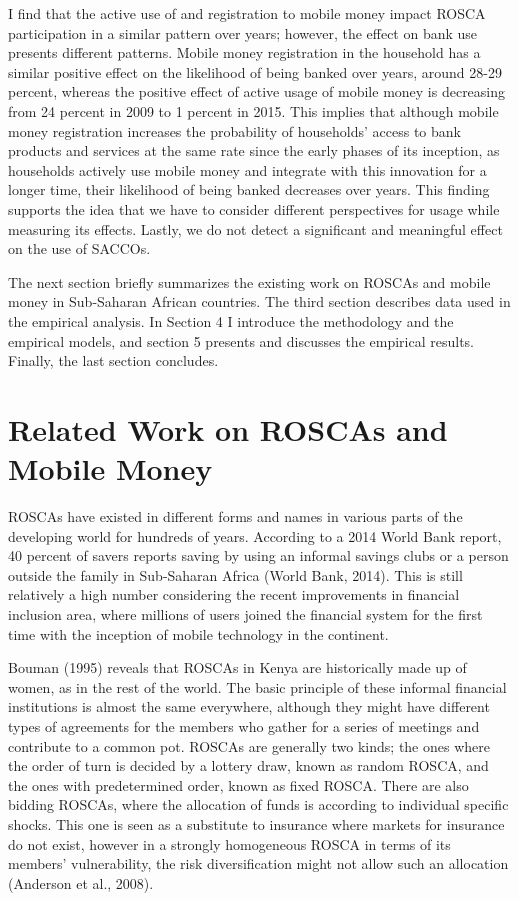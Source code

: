 \documentclass[11pt]{article}
\numberwithin{equation}{section}
\begin{document}
I find that the active use of and registration to mobile money impact ROSCA participation in a similar pattern over years; however, the effect on bank use presents different patterns. Mobile money registration in the household has a similar positive effect on the likelihood of being banked over years, around 28-29 percent, whereas the positive effect of active usage of mobile money is decreasing from 24 percent in 2009 to 1 percent in 2015. This implies that although mobile money registration increases the probability of households' access to bank products and services at the same rate since the early phases of its inception, as households actively use mobile money and integrate with this innovation for a longer time, their likelihood of being banked decreases over years. This finding supports the idea that we have to consider different perspectives for usage while measuring its effects. Lastly, we do not detect a significant and meaningful effect on the use of SACCOs.

The next section briefly summarizes the existing work on ROSCAs and mobile money in Sub-Saharan African countries. The third section describes data used in the empirical analysis. In Section 4 I introduce the methodology and the empirical models, and section 5 presents and discusses the empirical results. Finally, the last section concludes.


\section{Related Work on ROSCAs and Mobile Money}

ROSCAs have existed in different forms and names in various parts of the developing world for hundreds of years. According to a 2014 World Bank report, 40 percent of savers reports saving by using an informal savings clubs or a person outside the family in Sub-Saharan Africa (World Bank, 2014). This is still relatively a high number considering the recent improvements in financial inclusion area, where millions of users joined the financial system for the first time with the inception of mobile technology in the continent. 

Bouman (1995) reveals that ROSCAs in Kenya are historically made up of women, as in the rest of the world. The basic principle of these informal financial institutions is almost the same everywhere, although they might have different types of agreements for the members who gather for a series of meetings and contribute to a common pot. ROSCAs are generally two kinds; the ones where the order of turn is decided by a lottery draw, known as random ROSCA, and the ones with predetermined order, known as fixed ROSCA. There are also bidding ROSCAs, where the allocation of funds is according to individual specific shocks. This one is seen as a substitute to insurance where markets for insurance do not exist, however in a strongly homogeneous ROSCA in terms of its members' vulnerability, the risk diversification might not allow such an allocation (Anderson et al., 2008).
\end{document}

